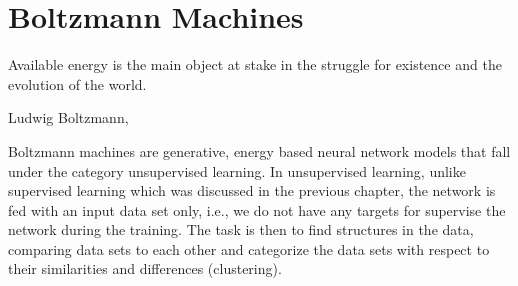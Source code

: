 \chapter{Boltzmann Machines} \label{chp:restricted}
\epigraph{Available energy is the main object at stake in the struggle for existence and the evolution of the world.}{Ludwig Boltzmann, \cite{rajasekar_ludwig_2006}}

Boltzmann machines are generative, energy based neural network models that fall under the category unsupervised learning. In unsupervised learning, unlike supervised learning which was discussed in the previous chapter, the network is fed with an input data set only, i.e., we do not have any targets for supervise the network during the training. The task is then to find structures in the data, comparing data sets to each other and categorize the data sets with respect to their similarities and differences (clustering).

